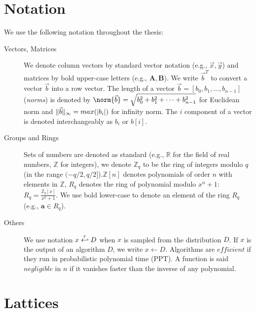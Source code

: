 \section{Notation}
\label{sec:defGeneral}
We use the following notation throughout the thesis:
\begin{description}
\item[Vectors, Matrices] We denote column vectors by standard vector notation
  (e.g., \(\vec{x}, \vec{y}\)) and matrices by bold upper-case letters (e.g.,
  \(\mathbf{A}, \mathbf{B}\)). We write \(\vec{b}^{T}\) to convert a vector
  \(\vec{b}\) into a row vector. The length of a vector
  \(\vec{b} = [b_{0}, b_{1}, \dots, b_{n-1}]\) (\textit{norms}) is denoted by
  \(\norm{\vec{b}} = \sqrt{b_{0}^{2} + b_{1}^{2} + \dots + b_{n-1}^{2}}\) for
  Euclidean norm and \(\Vert \vec{b} \Vert_{\infty} = max(|b_{i}|)\) for infinity norm. The
  \(i\) component of a vector is denoted interchangeably as \(b_{i}\) or
  \(b[i]\).
\item[Groups and Rings] Sets of numbers are denoted as standard (e.g.,
  \(\mathbb{R}\) for the field of real numbers, \(\mathbb{Z}\) for integers), we
  denote \(\mathbb{Z}_{q}\) to be the ring of integers modulo \(q\) (in the range
  \((-q/2,q/2]\)).\(\mathbb{Z}[n]\) denotes polynomials of order \(n\) with
  elements in \(\mathbb{Z}\), \(R_{q}\) denotes the ring of polynomial modulo
  \(x^{n} + 1\): \(R_{q} = \frac{\mathbb{Z}_{q}[x]}{x^{n} + 1}\). We use bold
  lower-case to denote an element of the ring \(R_{q}\) (e.g.,
  \(\mathbf{a} \in R_q\)).
\item[Others] We use notation \(x \stackrel{r}{\hookleftarrow} D\) when \(x\) is sampled from the distribution \(D\). If \(x\) is the output of an
  algorithm \(D\), we write \(x \gets D\). Algorithms are \(efficient\) if they
  run in probabilistic polynomial time (PPT). A function is said \(negligible\)
  in \(n\) if it vanishes faster than the inverse of any polynomial.
\end{description}

\section{Lattices}
\label{sec:defLattices}

